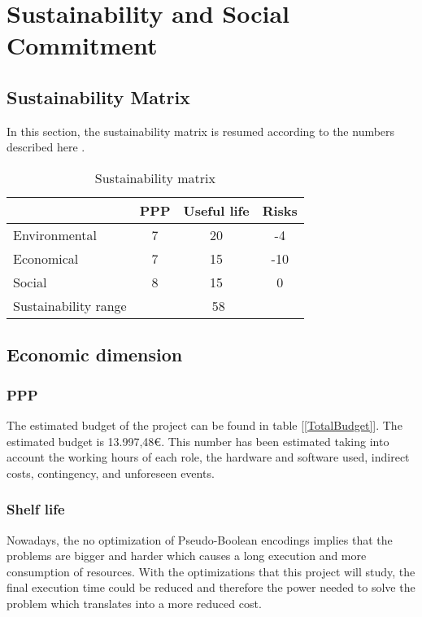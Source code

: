\chapter{Sustainability and Social Commitment}
\label{Chapter8}

\section{Sustainability Matrix}
In this section, the sustainability matrix is resumed according to the numbers described here \cite{MatrixPoints}.

\begin{table}[h]
	\centering
	\begin{tabular}{l|c|c|c|}
		\cline{2-4}
		& \multicolumn{1}{l|}{PPP} & Useful life & Risks \\ \hline
		\multicolumn{1}{|l|}{Environmental} & 7 & 20& -4\\ \hline
		\multicolumn{1}{|l|}{Economical} & 7 & 15 & -10\\ \hline
		\multicolumn{1}{|l|}{Social} & 8 & 15 & 0\\ \hline
		\multicolumn{1}{|l|}{Sustainability range} & \multicolumn{3}{c|}{58} \\ \hline
	\end{tabular}
	\caption{Sustainability matrix}
	\label{SustainabilityMatrix}
\end{table}


\section{Economic dimension}

\subsection{PPP}
The estimated budget of the project can be found in table [\ref{TotalBudget}]. The estimated budget is 13.997,48€. This number has been estimated taking into account the working hours of each role, the hardware and software used, indirect costs, contingency, and unforeseen events.
 
\subsection{Shelf life}
Nowadays, the no optimization of Pseudo-Boolean encodings implies that the problems are bigger and harder which causes a long execution and more consumption of resources. With the optimizations that this project will study, the final execution time could be reduced and therefore the power needed to solve the problem which translates into a more reduced cost.

